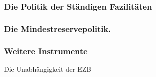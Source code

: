 \documentclass[
    onecolumn,
    a4paper,
    abstracton,
    parskip=half
    ,final
    ]{scrartcl}
\begin{document}
\subsubsection{Die Politik der St{\"a}ndigen Fazilit{\"a}ten}
\subsubsection{Die Mindestreservepolitik.}
\subsubsection{Weitere Instrumente}






Die Unabh{\"a}ngigkeit der EZB
\end{document}
